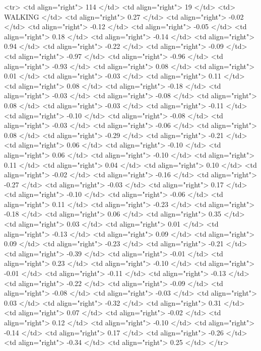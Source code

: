   <tr> <td align="right"> 114 </td> <td align="right">  19 </td> <td> WALKING </td> <td align="right"> 0.27 </td> <td align="right"> -0.02 </td> <td align="right"> -0.12 </td> <td align="right"> -0.05 </td> <td align="right"> 0.18 </td> <td align="right"> -0.14 </td> <td align="right"> 0.94 </td> <td align="right"> -0.22 </td> <td align="right"> -0.09 </td> <td align="right"> -0.97 </td> <td align="right"> -0.96 </td> <td align="right"> -0.93 </td> <td align="right"> 0.08 </td> <td align="right"> 0.01 </td> <td align="right"> -0.03 </td> <td align="right"> 0.11 </td> <td align="right"> 0.08 </td> <td align="right"> -0.18 </td> <td align="right"> -0.03 </td> <td align="right"> -0.08 </td> <td align="right"> 0.08 </td> <td align="right"> -0.03 </td> <td align="right"> -0.11 </td> <td align="right"> -0.10 </td> <td align="right"> -0.08 </td> <td align="right"> -0.03 </td> <td align="right"> -0.06 </td> <td align="right"> 0.08 </td> <td align="right"> -0.29 </td> <td align="right"> -0.21 </td> <td align="right"> 0.06 </td> <td align="right"> -0.10 </td> <td align="right"> 0.06 </td> <td align="right"> -0.10 </td> <td align="right"> 0.11 </td> <td align="right"> 0.04 </td> <td align="right"> 0.10 </td> <td align="right"> -0.02 </td> <td align="right"> -0.16 </td> <td align="right"> -0.27 </td> <td align="right"> -0.03 </td> <td align="right"> 0.17 </td> <td align="right"> -0.10 </td> <td align="right"> -0.06 </td> <td align="right"> 0.11 </td> <td align="right"> -0.23 </td> <td align="right"> -0.18 </td> <td align="right"> 0.06 </td> <td align="right"> 0.35 </td> <td align="right"> 0.03 </td> <td align="right"> 0.01 </td> <td align="right"> -0.13 </td> <td align="right"> 0.09 </td> <td align="right"> 0.09 </td> <td align="right"> -0.23 </td> <td align="right"> -0.21 </td> <td align="right"> -0.39 </td> <td align="right"> -0.01 </td> <td align="right"> 0.23 </td> <td align="right"> -0.10 </td> <td align="right"> -0.01 </td> <td align="right"> -0.11 </td> <td align="right"> -0.13 </td> <td align="right"> -0.22 </td> <td align="right"> -0.09 </td> <td align="right"> -0.08 </td> <td align="right"> -0.03 </td> <td align="right"> 0.03 </td> <td align="right"> -0.32 </td> <td align="right"> 0.31 </td> <td align="right"> 0.07 </td> <td align="right"> -0.02 </td> <td align="right"> 0.12 </td> <td align="right"> -0.10 </td> <td align="right"> -0.14 </td> <td align="right"> 0.17 </td> <td align="right"> -0.26 </td> <td align="right"> -0.34 </td> <td align="right"> 0.25 </td> </tr>
